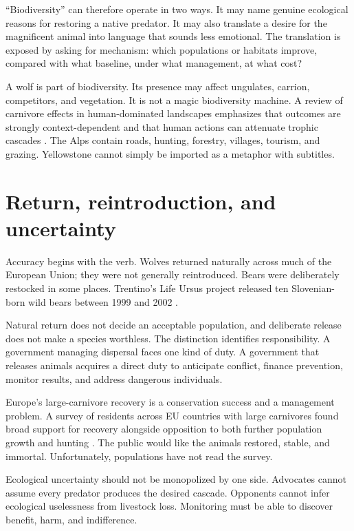 \documentclass[12pt,a4paper]{book}
\begin{document}
``Biodiversity'' can therefore operate in two ways.  It may name genuine
ecological reasons for restoring a native predator.  It may also translate a
desire for the magnificent animal into language that sounds less emotional.
The translation is exposed by asking for mechanism: which populations or
habitats improve, compared with what baseline, under what management, at what
cost?

A wolf is part of biodiversity.  Its presence may affect ungulates, carrion,
competitors, and vegetation.  It is not a magic biodiversity machine.  A review
of carnivore effects in human-dominated landscapes emphasizes that outcomes
are strongly context-dependent and that human actions can attenuate trophic
cascades \cite{KuijperCarnivores2016}.  The Alps contain roads, hunting,
forestry, villages, tourism, and grazing.  Yellowstone cannot simply be
imported as a metaphor with subtitles.

\section{Return, reintroduction, and uncertainty}

Accuracy begins with the verb.  Wolves returned naturally across much of the
European Union; they were not generally reintroduced.  Bears were deliberately
restocked in some places.  Trentino's Life Ursus project released ten
Slovenian-born wild bears between 1999 and 2002
\cite{ECLargeCarnivoreFacts2026,TrentinoLifeUrsus}.

Natural return does not decide an acceptable population, and deliberate
release does not make a species worthless.  The distinction identifies
responsibility.  A government managing dispersal faces one kind of duty.  A
government that releases animals acquires a direct duty to anticipate conflict,
finance prevention, monitor results, and address dangerous individuals.

Europe's large-carnivore recovery is a conservation success and a management
problem.  A survey of residents across EU countries with large carnivores found
broad support for recovery alongside opposition to both further population
growth and hunting \cite{ChapronCarnivoreOpinion2026}.  The public would like
the animals restored, stable, and immortal.  Unfortunately, populations have
not read the survey.

Ecological uncertainty should not be monopolized by one side.  Advocates
cannot assume every predator produces the desired cascade.  Opponents cannot
infer ecological uselessness from livestock loss.  Monitoring must be able to
discover benefit, harm, and indifference.
\end{document}
